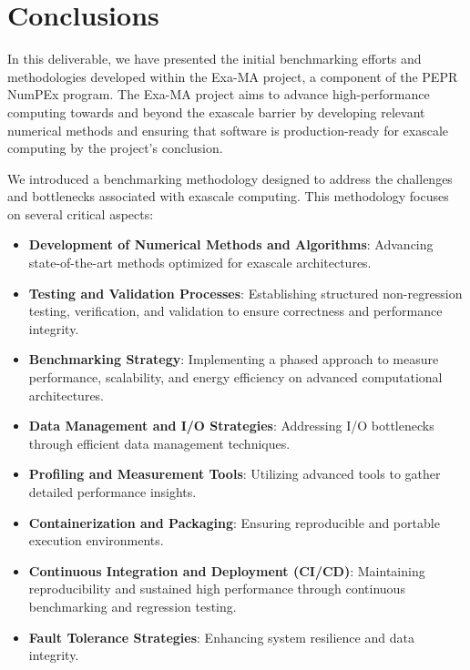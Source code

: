 
\clearpage
\section{Conclusions}
\label{sec:conclusions}

In this deliverable, we have presented the initial benchmarking efforts and methodologies developed within the Exa-MA project, a component of the PEPR NumPEx program. 
The Exa-MA project aims to advance high-performance computing towards and beyond the exascale barrier by developing relevant numerical methods and ensuring that software is production-ready for exascale computing by the project's conclusion.

We introduced a  benchmarking methodology designed to  address the challenges and bottlenecks associated with exascale computing. 
This methodology focuses on several critical aspects:

\begin{itemize}
    \item \textbf{Development of Numerical Methods and Algorithms}: Advancing state-of-the-art methods optimized for exascale architectures.
    \item \textbf{Testing and Validation Processes}: Establishing structured non-regression testing, verification, and validation to ensure correctness and performance integrity.
    \item \textbf{Benchmarking Strategy}: Implementing a phased approach to measure performance, scalability, and energy efficiency on advanced computational architectures.
    \item \textbf{Data Management and I/O Strategies}: Addressing I/O bottlenecks through efficient data management techniques.
    \item \textbf{Profiling and Measurement Tools}: Utilizing advanced tools to gather detailed performance insights.
    \item \textbf{Containerization and Packaging}: Ensuring reproducible and portable execution environments.
    \item \textbf{Continuous Integration and Deployment (CI/CD)}: Maintaining reproducibility and sustained high performance through continuous benchmarking and regression testing.
    \item \textbf{Fault Tolerance Strategies}: Enhancing system resilience and data integrity.
\end{itemize}

